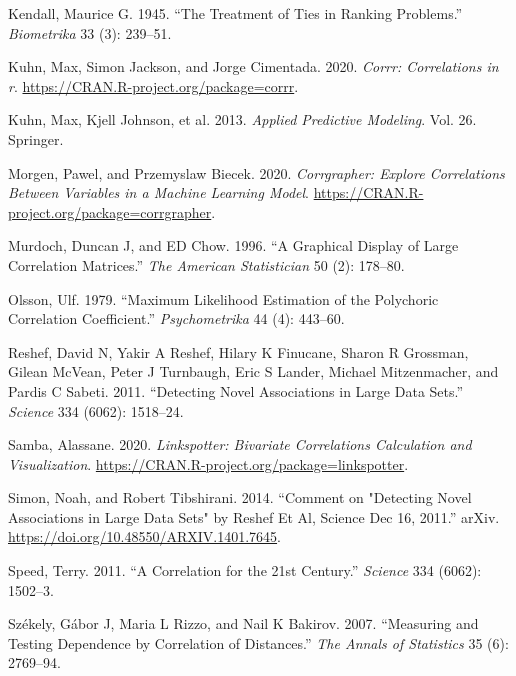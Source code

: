 \begin{CSLReferences}{1}{0}
\leavevmode{}%
Kendall, Maurice G. 1945. {``The Treatment of Ties in Ranking Problems.''} \emph{Biometrika} 33 (3): 239--51.

\leavevmode{}%
Kuhn, Max, Simon Jackson, and Jorge Cimentada. 2020. \emph{Corrr: Correlations in r}. \url{https://CRAN.R-project.org/package=corrr}.

\leavevmode{}%
Kuhn, Max, Kjell Johnson, et al. 2013. \emph{Applied Predictive Modeling}. Vol. 26. Springer.

\leavevmode{}%
Morgen, Pawel, and Przemyslaw Biecek. 2020. \emph{Corrgrapher: Explore Correlations Between Variables in a Machine Learning Model}. \url{https://CRAN.R-project.org/package=corrgrapher}.

\leavevmode{}%
Murdoch, Duncan J, and ED Chow. 1996. {``A Graphical Display of Large Correlation Matrices.''} \emph{The American Statistician} 50 (2): 178--80.

\leavevmode{}%
Olsson, Ulf. 1979. {``Maximum Likelihood Estimation of the Polychoric Correlation Coefficient.''} \emph{Psychometrika} 44 (4): 443--60.

\leavevmode{}%
Reshef, David N, Yakir A Reshef, Hilary K Finucane, Sharon R Grossman, Gilean McVean, Peter J Turnbaugh, Eric S Lander, Michael Mitzenmacher, and Pardis C Sabeti. 2011. {``Detecting Novel Associations in Large Data Sets.''} \emph{Science} 334 (6062): 1518--24.

\leavevmode{}%
Samba, Alassane. 2020. \emph{Linkspotter: Bivariate Correlations Calculation and Visualization}. \url{https://CRAN.R-project.org/package=linkspotter}.

\leavevmode{}%
Simon, Noah, and Robert Tibshirani. 2014. {``Comment on "Detecting Novel Associations in Large Data Sets" by Reshef Et Al, Science Dec 16, 2011.''} arXiv. \url{https://doi.org/10.48550/ARXIV.1401.7645}.

\leavevmode{}%
Speed, Terry. 2011. {``A Correlation for the 21st Century.''} \emph{Science} 334 (6062): 1502--3.

\leavevmode{}%
Székely, Gábor J, Maria L Rizzo, and Nail K Bakirov. 2007. {``Measuring and Testing Dependence by Correlation of Distances.''} \emph{The Annals of Statistics} 35 (6): 2769--94.


\end{CSLReferences}
